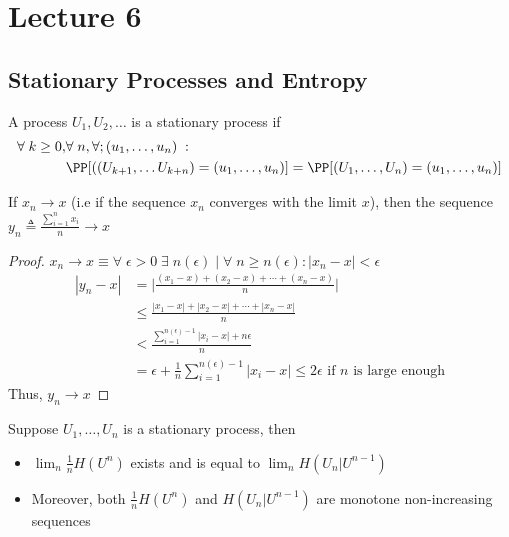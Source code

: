\chapter{Lecture 6}
\section{Stationary Processes and Entropy}
\begin{definition}
A process $U_1, U_2, \dots$ is a stationary process if 
\begin{align*}\forall\;k \geq 0, &\forall\; n, \forall; (u_1, \dots, u_n)\;:\; \\ &\PP[((U_{k+1}, \dots U_{k+n}) = (u_1, \dots, u_n)] = \PP[(U_1, \dots, U_n) = (u_1, \dots, u_n)]\end{align*}
\end{definition}
\begin{lemma}
If $x_n \to x$ (i.e if the sequence $x_n$ converges with the limit $x$), then the sequence $y_n \triangleq \frac{\sum_{i=1}^n x_i}{n} \to x$
\end{lemma}
\begin{proof}
$x_n \to x \equiv \forall \; \epsilon > 0\; \exists \;n(\epsilon) \; | \; \forall \; n \geq n(\epsilon) : |x_n - x| < \epsilon$
\begin{align*}
|y_n - x| &= \bigg| \frac{(x_1 - x) + (x_2 - x) + \cdots + (x_n - x)}{n}\bigg| \\
& \leq \frac{|x_1 - x| + |x_2 - x| + \cdots + |x_n - x|}{n} \\
&< \frac{\sum_{i=1}^{n(\epsilon) - 1}|x_i - x| + n\epsilon}{n} \\
&= \epsilon + \frac{1}{n} \sum_{i=1}^{n(\epsilon) - 1} |x_i - x| \leq 2 \epsilon \text{ if $n$ is large enough}
\end{align*}
Thus, $y_n \to x$
\end{proof}
\begin{theorem}
Suppose $U_1, \dots, U_n$ is a stationary process, then
\begin{itemize}
    \item $\lim_n \frac{1}{n} H(U^n)$ exists and is equal to $\lim_n H(U_n|U^{n-1})$
    \item Moreover, both $\frac{1}{n} H(U^n)$ and $H(U_n | U^{n-1})$ are monotone non-increasing sequences
\end{itemize}
\end{theorem}
